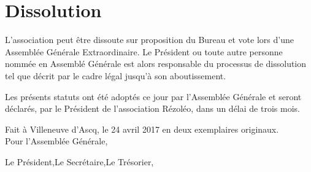 \documentclass[12pt]{constitution}
\begin{document}
	\section{Dissolution}
	L'association peut être dissoute sur proposition du Bureau et vote lors d'une Assemblée Générale Extraordinaire.
	Le Président ou toute autre personne nommée en Assemblé Générale est alors responsable du processus de dissolution tel que décrit par le cadre légal jusqu'à son aboutissement.

	\newpage

	Les présents statuts ont été adoptés ce jour par l'Assemblée Générale et seront déclarés, par le Président de l'association Rézoléo, dans un délai de trois mois.
	\begin{flushright}
		Fait à Villeneuve d'Ascq, le 24 avril 2017 en deux exemplaires originaux.\\
		Pour l'Assemblée Générale,
	\end{flushright}
	\noindent Le Président,\hfill  Le Secrétaire,\hfill  Le Trésorier, \\
\end{document}
